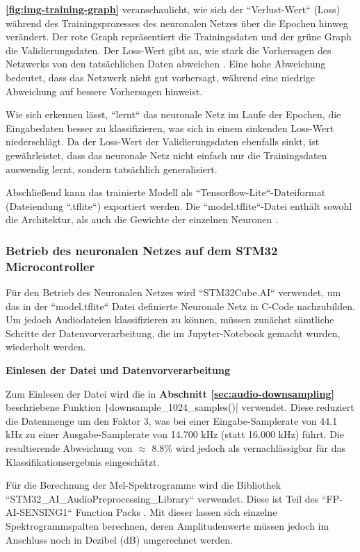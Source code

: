 \textbf{\autoref{fig:img-training-graph}} veranschaulicht, wie sich der ``Verlust-Wert`` (Loss) während des Trainingsprozesses des neuronalen Netzes über die Epochen hinweg verändert. Der rote Graph repräsentiert die Trainingsdaten und der grüne Graph die Validierungsdaten. Der Loss-Wert gibt an, wie stark die Vorhersagen des Netzwerks von den tatsächlichen Daten abweichen \cite{neural-network-basics}. Eine hohe Abweichung bedeutet, dass das Netzwerk nicht gut vorhersagt, während eine niedrige Abweichung auf bessere Vorhersagen hinweist.

Wie sich erkennen lässt, ``lernt`` das neuronale Netz im Laufe der Epochen, die Eingabedaten besser zu klassifizieren, was sich in einem sinkenden Loss-Wert niederschlägt. Da der Loss-Wert der Validierungsdaten ebenfalls sinkt, ist gewährleistet, dass das neuronale Netz nicht einfach nur die Trainingsdaten auswendig lernt, sondern tatsächlich generalisiert.

Abschließend kann das trainierte Modell als ``Tensorflow-Lite``-Dateiformat (Dateiendung ``.tflite``) exportiert werden. Die ``model.tflite``-Datei enthält sowohl die Architektur, als auch die Gewichte der einzelnen Neuronen \cite{tflite-file}.

\subsubsection{Betrieb des neuronalen Netzes auf dem STM32 Microcontroller}

Für den Betrieb des Neuronalen Netzes wird ``STM32Cube.AI`` verwendet, um das in der ``model.tflite`` Datei definierte Neuronale Netz in C-Code nachzubilden. Um jedoch Audiodateien klassifizieren zu können, müssen zunächst sämtliche Schritte der Datenvorverarbeitung, die im Jupyter-Notebook gemacht wurden, wiederholt werden.

\textbf{Einlesen der Datei und Datenvorverarbeitung}


Zum Einlesen der Datei wird die in \textbf{Abschnitt \ref{sec:audio-downsampling}} beschriebene Funktion \texttt|downsample_1024_samples()| verwendet. Diese reduziert die Datenmenge um den Faktor 3, was bei einer Eingabe-Samplerate von 44.1 kHz zu einer Ausgabe-Samplerate von 14.700 kHz (statt 16.000 kHz) führt. Die resultierende Abweichung von $\approx$ 8.8\% wird jedoch als vernachlässigbar für das Klassifikationsergebnis eingeschätzt.

Für die Berechnung der Mel-Spektrogramme wird die Bibliothek ``STM32\_AI\_AudioPreprocessing\_Library`` verwendet. Diese ist Teil des ``FP-AI-SENSING1`` Function Packs \cite{fp-ai-sensing1}. Mit dieser lassen sich einzelne Spektrogrammspalten berechnen, deren Amplitudenwerte müssen jedoch im Anschluss noch in Dezibel (dB) umgerechnet werden.

